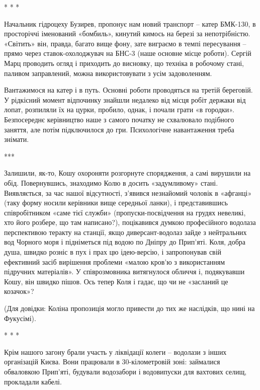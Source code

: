 
* * *

Начальник гідроцеху Бузирев, пропонує нам новий транспорт – катер БМК-130, в
просторіччі іменований «бомбиль», кинутий кимось на березі за непотрібністю.
«Світить» він, правда, багато вище фону, зате виграємо в темпі пересування –
прямо через ставок-охолоджувач на БНС-3 (наше основне місце роботи). Сергій
Марц проводить огляд і приходить до висновку, що техніка в робочому стані,
паливом заправлений, можна використовувати з усім задоволенням.


Вантажимося на катер і в путь. Основні роботи проводяться на третій береговій.
У рідкісний момент відпочинку знайшли недалеко від місця робіт держаки від
лопат, розпиляли їх на цурки, пробило, однак, і почали грати «в городки».
Безпосереднє керівництво наше з самого початку не схвалювало подібного заняття,
але потім підключилося до гри. Психологічне навантаження треба знімати.


***

Залишили, як-то, Кошу охороняти розгорнуте спорядження, а самі вирушили на
обід. Повернувшись, знаходимо Колю в досить «задумливому» стані. Виявляється,
за час нашої відсутності, з'явився незнайомий чоловік в «афганці» (таку форму
носили керівники вище середньої ланки), і представившись співробітником «саме
тієї служби» (пропуски-посвідчення на грудях невеликі, хто його розбере, що там
написано?), поцікавився думкою професійного водолаза перспективою теракту на
станції, якщо диверсант-водолаз зайде з нейтральних вод Чорного моря і
підніметься під водою по Дніпру до Прип'яті. Коля, добра душа, швидко розніс в
пух і прах цю ідею-версію, і запропонував свій ефективний засіб вирішення
проблеми «малою кров'ю з використанням підручних матеріалів». У співрозмовника
витягнулося обличчя і, подякувавши Кошу, він швидко пішов. Ось тепер Коля і
гадає, що чи не «засланий це козачок»? 

(Для довідки: Коліна пропозиція могло привести до тих же наслідків, що нині на
Фукусімі).

* * *

Крім нашого загону брали участь у ліквідації колеги – водолази з інших
організацій Києва. Вони працювали в 30-кілометровій зоні: займалися обваловкою
Прип'яті, будували водозабори і водовипуски для вахтових селищ, прокладали
кабелі.

